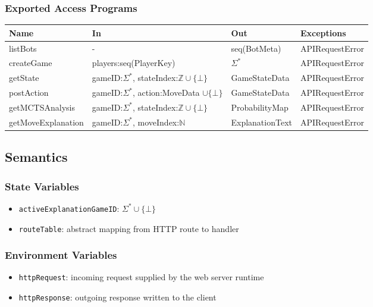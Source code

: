 \documentclass[12pt, titlepage]{article}
\begin{document}
\subsubsection{Exported Access Programs}
\begin{center}
\begin{tabular}{p{5cm} p{4cm} p{4cm} p{3cm}}
\hline
\textbf{Name} & \textbf{In} & \textbf{Out} & \textbf{Exceptions} \\
\hline
listBots & - & seq(BotMeta) & APIRequestError \\
createGame & players:seq(PlayerKey) & $\Sigma^*$ & APIRequestError \\
getState & gameID:$\Sigma^*$, stateIndex:$\mathbb{Z} \cup \{\bot\}$ & GameStateData & APIRequestError \\
postAction & gameID:$\Sigma^*$, action:MoveData $\cup \{\bot\}$ & GameStateData & APIRequestError \\
getMCTSAnalysis & gameID:$\Sigma^*$, stateIndex:$\mathbb{Z} \cup \{\bot\}$ & ProbabilityMap & APIRequestError \\
getMoveExplanation & gameID:$\Sigma^*$, moveIndex:$\mathbb{N}$ & ExplanationText & APIRequestError \\
\hline
\end{tabular}
\end{center}

\subsection{Semantics}

\subsubsection{State Variables}
\begin{itemize}
\item \texttt{activeExplanationGameID}: $\Sigma^* \cup \{\bot\}$
\item \texttt{routeTable}: abstract mapping from HTTP route to handler
\end{itemize}

\subsubsection{Environment Variables}
\begin{itemize}
\item \texttt{httpRequest}: incoming request supplied by the web server runtime
\item \texttt{httpResponse}: outgoing response written to the client
\end{itemize}
\end{document}
